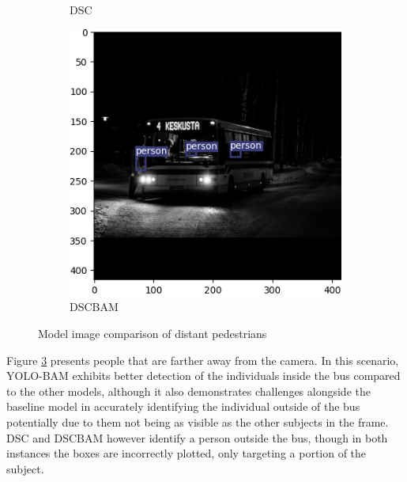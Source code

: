\begin{figure}[!htbp]
\begin{subfigure}{.2\textwidth}
  \caption{DSC}
  \label{fig:dscbus}
\end{subfigure}%
\begin{subfigure}{.2\textwidth}
  \centering
  \includegraphics[width=\textwidth]{images/DSCBAM_bus.png}
  \caption{DSCBAM}
  \label{fig:dscbambus}
\end{subfigure}
\caption{Model image comparison of distant pedestrians}
\label{fig:bus}
\end{figure}

Figure \ref{fig:bus} presents people that are farther away from the camera. In this scenario, YOLO-BAM exhibits better detection of the individuals inside the bus compared to the other models, although it also demonstrates challenges alongside the baseline model in accurately identifying the individual outside of the bus potentially due to them not being as visible as the other subjects in the frame. DSC and DSCBAM however identify a person outside the bus, though in both instances the boxes are incorrectly plotted, only targeting a portion of the subject.


